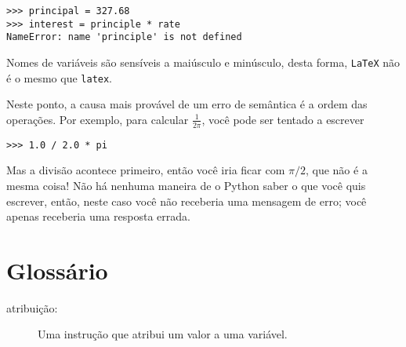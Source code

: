 {{{{{{{{{{{{{{{{{\beforeverb
\begin{verbatim}
>>> principal = 327.68
>>> interest = principle * rate
NameError: name 'principle' is not defined
\end{verbatim}
\afterverb
%
Nomes de variáveis são sensíveis a maiúsculo e minúsculo, desta forma, {\tt LaTeX} 
não é o mesmo que {\tt latex}.


Neste ponto, a causa mais provável de um erro de semântica é 
a ordem das operações. Por exemplo, para calcular $\frac{1}{2 \pi}$,
você pode ser tentado a escrever

\beforeverb
\begin{verbatim}
>>> 1.0 / 2.0 * pi
\end{verbatim}
\afterverb
%
Mas a divisão acontece primeiro, então você iria ficar com $\pi / 2$, que 
não é a mesma coisa! Não há nenhuma maneira de o Python 
saber o que você quis escrever, então, neste caso você não 
receberia uma mensagem de erro; você apenas receberia uma resposta errada.


\section{Glossário}

\begin{description}

\item[atribuição:] Uma instrução que atribui um valor a uma variável.


\end{description}}}}}}}}}}}}}}}}}}
